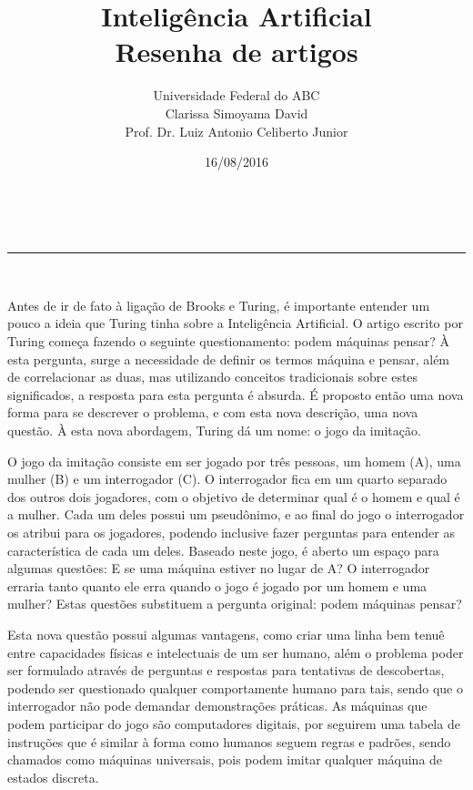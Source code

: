 \documentclass[a4paper,11pt]{article}
\makeatletter
\newcommand{\linia}{\rule{\linewidth}{0.5pt}}
\renewcommand{\maketitle}{
\begin{center}
\vspace{2ex}
{\huge \textsc{\@title}}
\vspace{1ex}
\\
\linia\\
\@author \hfill \@date
\vspace{4ex}
\end{center}
}
\makeatother
\begin{document}
\title{Inteligência Artificial\\ Resenha de artigos}

\author{Universidade Federal do ABC\\
Clarissa Simoyama David\\
Prof. Dr. Luiz Antonio Celiberto Junior\\}

\date{16/08/2016}

\maketitle

Antes de ir de fato à ligação de Brooks e Turing, é importante entender um pouco a ideia que Turing tinha sobre a Inteligência Artificial. O artigo escrito por Turing começa fazendo o seguinte questionamento: podem máquinas pensar? À esta pergunta, surge a necessidade de definir os termos máquina e pensar, além de correlacionar as duas, mas utilizando conceitos tradicionais sobre estes significados, a resposta para esta pergunta é absurda. É proposto então uma nova forma para se descrever o problema, e com esta nova descrição, uma nova questão. À esta nova abordagem, Turing dá um nome: o jogo da imitação.

O jogo da imitação consiste em ser jogado por três pessoas, um homem (A), uma mulher (B) e um interrogador (C). O interrogador fica em um quarto separado dos outros dois jogadores, com o objetivo de determinar qual é o homem e qual é a mulher. Cada um deles possui um pseudônimo, e ao final do jogo o interrogador os atribui para os jogadores, podendo inclusive fazer perguntas para entender as característica de cada um deles. Baseado neste jogo, é aberto um espaço para algumas questões: E se uma máquina estiver no lugar de A? O interrogador erraria tanto quanto ele erra quando o jogo é jogado por um homem e uma mulher? Estas questões substituem a pergunta original: podem máquinas pensar?

Esta nova questão possui algumas vantagens, como criar uma linha bem tenuê entre capacidades físicas e intelectuais de um ser humano, além o problema poder ser formulado através de perguntas e respostas para tentativas de descobertas, podendo ser questionado qualquer comportamente humano para tais, sendo que o interrogador não pode demandar demonstrações práticas. As máquinas que podem participar do jogo são computadores digitais, por seguirem uma tabela de instruções que é similar à forma como humanos seguem regras e padrões, sendo chamados como máquinas universais, pois podem imitar qualquer máquina de estados discreta. 
\end{document}
